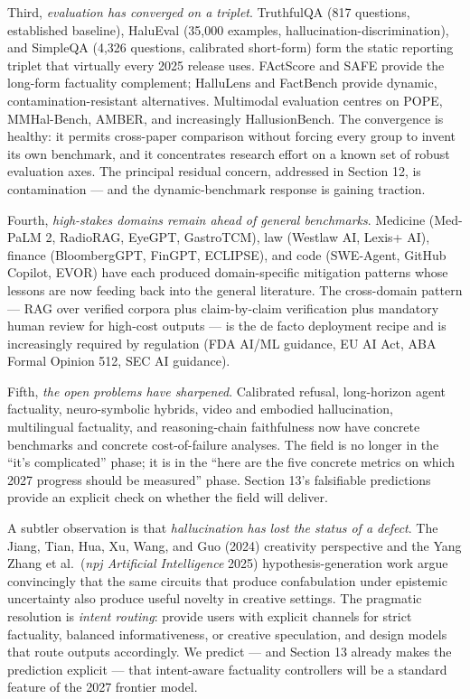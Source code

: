\documentclass{article}
\begin{document}
Third, \emph{evaluation has converged on a triplet}. TruthfulQA (817 questions, established baseline), HaluEval (35,000 examples, hallucination-discrimination), and SimpleQA (4,326 questions, calibrated short-form) form the static reporting triplet that virtually every 2025 release uses. FActScore and SAFE provide the long-form factuality complement; HalluLens and FactBench provide dynamic, contamination-resistant alternatives. Multimodal evaluation centres on POPE, MMHal-Bench, AMBER, and increasingly HallusionBench. The convergence is healthy: it permits cross-paper comparison without forcing every group to invent its own benchmark, and it concentrates research effort on a known set of robust evaluation axes. The principal residual concern, addressed in Section 12, is contamination --- and the dynamic-benchmark response is gaining traction.

Fourth, \emph{high-stakes domains remain ahead of general benchmarks}. Medicine (Med-PaLM 2, RadioRAG, EyeGPT, GastroTCM), law (Westlaw AI, Lexis+ AI), finance (BloombergGPT, FinGPT, ECLIPSE), and code (SWE-Agent, GitHub Copilot, EVOR) have each produced domain-specific mitigation patterns whose lessons are now feeding back into the general literature. The cross-domain pattern --- RAG over verified corpora plus claim-by-claim verification plus mandatory human review for high-cost outputs --- is the de facto deployment recipe and is increasingly required by regulation (FDA AI/ML guidance, EU AI Act, ABA Formal Opinion 512, SEC AI guidance).

Fifth, \emph{the open problems have sharpened}. Calibrated refusal, long-horizon agent factuality, neuro-symbolic hybrids, video and embodied hallucination, multilingual factuality, and reasoning-chain faithfulness now have concrete benchmarks and concrete cost-of-failure analyses. The field is no longer in the ``it's complicated'' phase; it is in the ``here are the five concrete metrics on which 2027 progress should be measured'' phase. Section 13's falsifiable predictions provide an explicit check on whether the field will deliver.

A subtler observation is that \emph{hallucination has lost the status of a defect}. The Jiang, Tian, Hua, Xu, Wang, and Guo (2024) creativity perspective and the Yang Zhang et al.~(\emph{npj Artificial Intelligence} 2025) hypothesis-generation work argue convincingly that the same circuits that produce confabulation under epistemic uncertainty also produce useful novelty in creative settings. The pragmatic resolution is \emph{intent routing}: provide users with explicit channels for strict factuality, balanced informativeness, or creative speculation, and design models that route outputs accordingly. We predict --- and Section 13 already makes the prediction explicit --- that intent-aware factuality controllers will be a standard feature of the 2027 frontier model.
\end{document}
